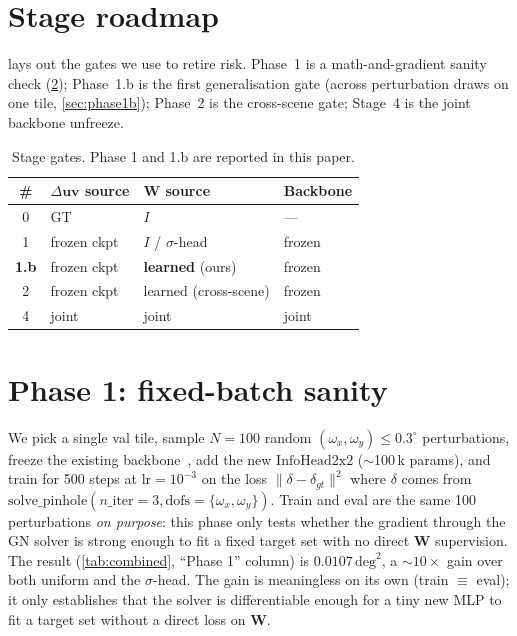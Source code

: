 \documentclass[10pt,conference,a4paper]{IEEEtran}
\newcommand{\Suv}{\Delta\mathbf{uv}}
\newcommand{\W}{\mathbf{W}}
\begin{document}
\section{Stage roadmap}\label{sec:stages}

 lays out the gates we use to retire risk. Phase~1 is
a math-and-gradient sanity check (\cref{sec:phase1}); Phase~1.b is the
first generalisation gate (across perturbation draws on one tile,
\cref{sec:phase1b}); Phase~2 is the cross-scene gate; Stage~4 is the
joint backbone unfreeze.

\begin{table}[h]
\centering
\caption{Stage gates. Phase 1 and 1.b are reported in this paper.}
\label{tab:stages}
\begin{tabular}{clll}
\toprule
\# & $\Suv$ source     & $\W$ source           & Backbone \\
\midrule
0  & GT                & $I$                   & ---      \\
1  & frozen ckpt       & $I$ / $\sigma$-head   & frozen   \\
\textbf{1.b} & frozen ckpt & \textbf{learned} (ours) & frozen \\
2  & frozen ckpt       & learned (cross-scene) & frozen   \\
4  & joint             & joint                 & joint    \\
\bottomrule
\end{tabular}
\end{table}

\section{Phase 1: fixed-batch sanity}\label{sec:phase1}

We pick a single val tile, sample $N{=}100$ random
$(\omega_x, \omega_y) \le 0.3^\circ$ perturbations, freeze the existing
backbone~\cite{cite:CalibNetDepth}, add the new
$\mathrm{InfoHead2x2}$ ($\sim$100\,k params), and train for 500 steps
at $\mathrm{lr}{=}10^{-3}$ on the loss
$\|\delta - \delta_{gt}\|^2$ where $\delta$ comes from
$\mathrm{solve\_pinhole}(n{\_}\mathrm{iter}{=}3,
\mathrm{dofs}{=}\{\omega_x,\omega_y\})$.
Train and eval are the same 100 perturbations \emph{on purpose}: this
phase only tests whether the gradient through the GN solver is strong
enough to fit a fixed target set with no direct $\W$ supervision. The
result (\cref{tab:combined}, ``Phase 1'' column) is $0.0107\,\mathrm{deg}^2$,
a $\sim$$10\times$ gain over both uniform and the $\sigma$-head. The
gain is meaningless on its own (train $\equiv$ eval); it only
establishes that the solver is differentiable enough for a tiny new MLP
to fit a target set without a direct loss on $\W$.
\end{document}
